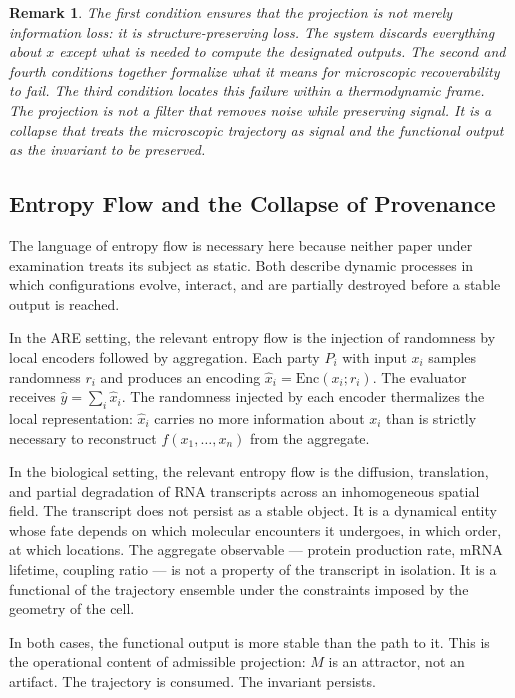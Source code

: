 \documentclass[12pt, a4paper]{article}
\theoremstyle{essaystyle}
\newtheorem*{remark}{Remark}
\begin{document}
\begin{remark}
The first condition ensures that the projection is not merely information loss: it is
structure-preserving loss. The system discards everything about $x$ except what is
needed to compute the designated outputs. The second and fourth conditions together
formalize what it means for microscopic recoverability to fail. The third condition
locates this failure within a thermodynamic frame. The projection is not a filter that
removes noise while preserving signal. It is a collapse that treats the microscopic
trajectory as signal and the functional output as the invariant to be preserved.
\end{remark}

\subsection{Entropy Flow and the Collapse of Provenance}

The language of entropy flow is necessary here because neither paper under examination
treats its subject as static. Both describe dynamic processes in which configurations
evolve, interact, and are partially destroyed before a stable output is reached.

In the ARE setting, the relevant entropy flow is the injection of randomness by local
encoders followed by aggregation. Each party $P_i$ with input $x_i$ samples randomness
$r_i$ and produces an encoding $\hat{x}_i = \mathrm{Enc}(x_i; r_i)$. The evaluator
receives $\hat{y} = \sum_i \hat{x}_i$. The randomness injected by each encoder
thermalizes the local representation: $\hat{x}_i$ carries no more information about
$x_i$ than is strictly necessary to reconstruct $f(x_1, \ldots, x_n)$ from the
aggregate.

In the biological setting, the relevant entropy flow is the diffusion, translation, and
partial degradation of RNA transcripts across an inhomogeneous spatial field. The
transcript does not persist as a stable object. It is a dynamical entity whose fate
depends on which molecular encounters it undergoes, in which order, at which locations.
The aggregate observable --- protein production rate, mRNA lifetime, coupling ratio ---
is not a property of the transcript in isolation. It is a functional of the trajectory
ensemble under the constraints imposed by the geometry of the cell.

In both cases, the functional output is more stable than the path to it. This is the
operational content of admissible projection: $M$ is an attractor, not an artifact.
The trajectory is consumed. The invariant persists.
\end{document}
